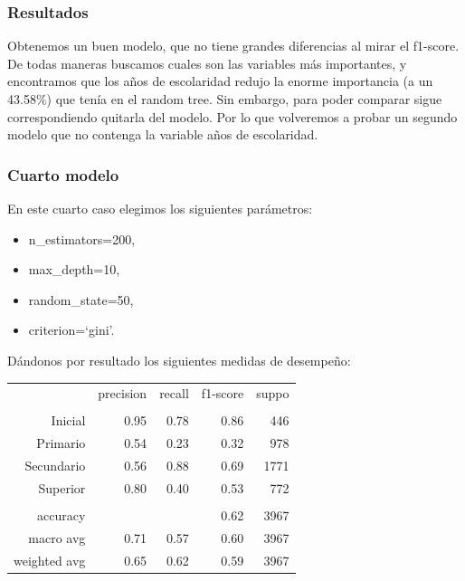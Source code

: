 \documentclass[a4paper]{article}
\begin{document}
            \subsubsection*{Resultados}

             Obtenemos un buen modelo, que no tiene grandes diferencias al mirar el f1-score. De todas maneras buscamos cuales son las variables más importantes, y encontramos que los años de escolaridad redujo la enorme importancia (a un 43.58\%) que tenía en el random tree. Sin embargo, para poder comparar sigue correspondiendo quitarla del modelo. Por lo que volveremos a probar un segundo modelo que no contenga la variable años de escolaridad. 

        \subsubsection{Cuarto modelo}

            En este cuarto caso elegimos los siguientes parámetros:
            \begin{itemize}
                \item n\_estimators=200,
                \item max\_depth=10,
                \item random\_state=50,
                \item criterion=`gini'.
            \end{itemize}

            Dándonos por resultado los siguientes medidas de desempeño:
            \begin{table}[H]
                \centering
                \begin{tabular}{rrrrr}
                    ~ & precision & recall & f1-score & suppo \\
                    & & & & \\
                    Inicial    & 0.95 & 0.78 & 0.86 & 446 \\
                    Primario   & 0.54 & 0.23 & 0.32 & 978 \\
                    Secundario & 0.56 & 0.88 & 0.69 & 1771 \\
                    Superior   & 0.80 & 0.40 & 0.53 & 772 \\
                    & & & & \\
                    accuracy & & & 0.62 & 3967 \\
                    macro avg & 0.71 & 0.57 & 0.60 & 3967 \\
                    weighted avg & 0.65 & 0.62 & 0.59 & 3967 \\
                \end{tabular}
            \end{table}
\end{document}
